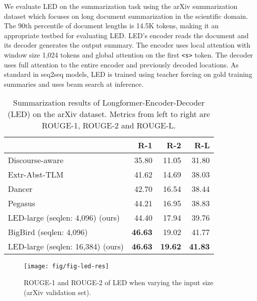 \documentclass[11pt,a4paper]{article}
\begin{document}
We evaluate LED on the summarization task using the arXiv summarization dataset \cite{arxiv2018} which focuses on long document summarization in the scientific domain. The 90th percentile of document lengths is 14.5K tokens, making it an appropriate testbed for evaluating LED. LED's encoder reads the document and its decoder generates the output summary. The encoder uses local attention with window size 1,024 tokens and global attention on the first \texttt{<s>} token. The decoder uses full attention to the entire encoder and previously decoded locations. As standard in seq2seq models, LED is trained using teacher forcing on gold training summaries and uses beam search at inference.


\begin{table}[]
\centering
\small
\begin{tabular}{@{}lrrr@{}}
\toprule
                & R-1   & R-2   & R-L   \\ \midrule
Discourse-aware \citeyearpar{arxiv2018} & 35.80 & 11.05 & 31.80 \\
Extr-Abst-TLM \citeyearpar{Subramanian2020OnEA}   & 41.62 & 14.69 & 38.03 \\
Dancer  \citeyearpar{Gidiotis2020ADA}        & 42.70 & 16.54 & 38.44 \\
Pegasus \citeyearpar{zhang2019pegasus}        & 44.21 & 16.95 & 38.83 \\ 
LED-large (seqlen: 4,096) (ours) &   44.40      &  17.94     & 39.76 \\
BigBird (seqlen: 4,096) \citeyearpar{Zaheer2020BigBT}        & \bf{46.63} & 19.02 & 41.77 \\
\hdashline[.4pt/1pt]
LED-large (seqlen: 16,384) (ours) & \bf{46.63}      &  \textbf{19.62}     & \bf{41.83}       \\ \bottomrule
\end{tabular}
\caption{Summarization results of Longformer-Encoder-Decoder (LED) on the arXiv dataset.  Metrics from left to right are ROUGE-1, ROUGE-2 and ROUGE-L.}\label{tab:summarization}
\end{table}


\begin{figure}[t!]
    \centering
    \texttt{[image: fig/fig-led-res]}
    \caption{
    ROUGE-1 and ROUGE-2 of LED when varying the input size (arXiv validation set).
    }
    \label{fig:led}
\end{figure} 
\end{document}
